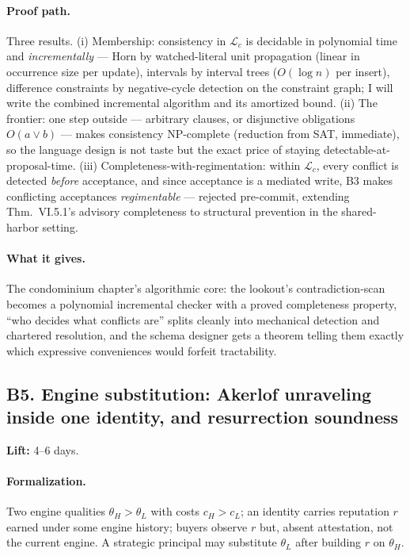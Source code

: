 \documentclass[11pt,a4paper]{article}
\newcommand{\lift}[1]{\noindent\textbf{Lift:} #1.}
\newcommand{\gives}{\paragraph{What it gives.}}
\newcommand{\form}{\paragraph{Formalization.}}
\newcommand{\proofpath}{\paragraph{Proof path.}}
\begin{document}
\proofpath Three results. (i) Membership: consistency in $\mathcal{L}_c$ is decidable in polynomial time and \emph{incrementally} --- Horn by watched-literal unit propagation (linear in occurrence size per update), intervals by interval trees ($O(\log n)$ per insert), difference constraints by negative-cycle detection on the constraint graph; I will write the combined incremental algorithm and its amortized bound. (ii) The frontier: one step outside --- arbitrary clauses, or disjunctive obligations $O(a \vee b)$ --- makes consistency NP-complete (reduction from SAT, immediate), so the language design is not taste but the exact price of staying detectable-at-proposal-time. (iii) Completeness-with-regimentation: within $\mathcal{L}_c$, every conflict is detected \emph{before} acceptance, and since acceptance is a mediated write, B3 makes conflicting acceptances \emph{regimentable} --- rejected pre-commit, extending Thm.~VI.5.1's advisory completeness to structural prevention in the shared-harbor setting.

\gives The condominium chapter's algorithmic core: the lookout's contradiction-scan becomes a polynomial incremental checker with a proved completeness property, ``who decides what conflicts are'' splits cleanly into mechanical detection and chartered resolution, and the schema designer gets a theorem telling them exactly which expressive conveniences would forfeit tractability.

\subsection{B5. Engine substitution: Akerlof unraveling inside one identity, and resurrection soundness}
\lift{4--6 days}

\form Two engine qualities $\theta_H > \theta_L$ with costs $c_H > c_L$; an identity carries reputation $r$ earned under some engine history; buyers observe $r$ but, absent attestation, not the current engine. A strategic principal may substitute $\theta_L$ after building $r$ on $\theta_H$.
\end{document}
